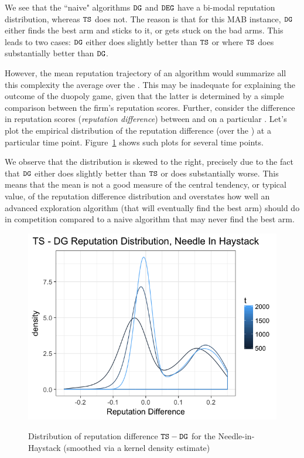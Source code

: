 \documentclass[../competing_bandits.tex]{subfiles}
\begin{document}
We see that the ``naive" algorithms $\mathtt{DG}$ and $\mathtt{DEG}$ have a bi-modal reputation distribution, whereas $\mathtt{TS}$ does not. The reason is that for this MAB instance, $\mathtt{DG}$ either finds the best arm and sticks to it, or gets stuck on the bad arms. This leads to two cases: $\mathtt{DG}$ either does slightly better than $\mathtt{TS}$ or where $\mathtt{TS}$ does substantially better than $\mathtt{DG}$.

However, the mean reputation trajectory of an algorithm would summarize all this complexity the average over the \MRVs. This may be inadequate for explaining the outcome of the duopoly game, given that the latter is determined by a simple comparison between the firm's reputation scores. Further, consider the difference in reputation scores (\emph{reputation difference}) between \TS and \DG on a particular \MRV. Let's plot the empirical distribution of the reputation difference (over the \MRVs) at a particular time point. Figure~\ref{ts_dg_rep_diff_nih} shows such plots for several time points.

We observe that the distribution is skewed to the right, precisely due to the fact that $\mathtt{DG}$ either does slightly better than $\mathtt{TS}$ or does substantially worse. This means that the mean is not a good measure of the central tendency, or typical value, of the reputation difference distribution and overstates how well an advanced exploration algorithm (that will eventually find the best arm) should do in competition compared to a naive algorithm that may never find the best arm.

\begin{figure}[ht]
\caption{Distribution of reputation difference $\mathtt{TS}-\mathtt{DG}$ for the Needle-in-Haystack (smoothed via a kernel density estimate)}
\includegraphics[scale=0.35]{figures/ts_dg_rep_diff_nih}
\label{ts_dg_rep_diff_nih}
\end{figure}
\end{document}

